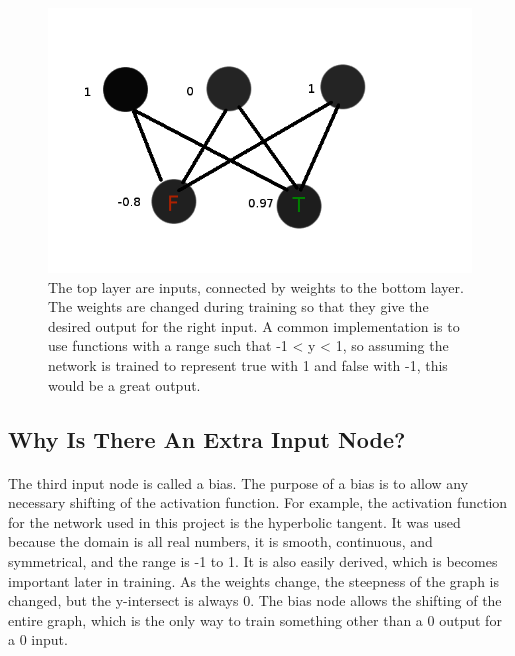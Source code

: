 \documentclass{article}
\begin{document}
    \begin{figure}
        \centering
        \includegraphics[scale=0.4]{images/perceptron.png}
        \caption{The top layer are inputs, connected by weights to the bottom 
            layer. The weights are changed during training so that they give the 
            desired output for the right input. A common implementation is to use 
            functions with a range such that -1 < y < 1, so assuming the network 
            is trained to represent true with 1 and false with -1, this would be 
            a great output.}
        \label{basicnetwork}
    \end{figure}

\subsection{Why Is There An Extra Input Node?}

    \paragraph{}The third input node is called a bias. The purpose of a bias is 
    to allow any necessary shifting of the activation function. For example, the 
    activation function for the network used in this project is the hyperbolic 
    tangent. It was used because the domain is all real numbers, it is smooth, 
    continuous, and symmetrical, and the range is -1 to 1. It is also easily 
    derived, which is becomes important later in training. As the weights change, 
    the steepness of the graph is changed, but the y-intersect is always 0. The 
    bias node allows the shifting of the entire graph, which is the only way to 
    train something other than a 0 output for a 0 input.
\end{document}
